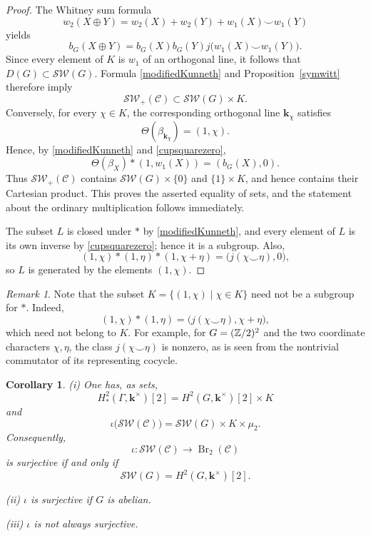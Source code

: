 \documentclass[12pt]{amsart}
\numberwithin{equation}{section}
\providecommand{\k}{}\renewcommand{\k}{\mathbf{k}}
\providecommand{\C}{}\renewcommand{\C}{\mathcal{C}}
\providecommand{\Br}{}\renewcommand{\Br}{\operatorname{Br}}
\theoremstyle{plain}
\newtheorem{corollary}[theorem]{Corollary}
\theoremstyle{definition}
\theoremstyle{remark}
\newtheorem{remark}[theorem]{Remark}
\begin{document}
\begin{proof} The Whitney sum formula
$$
w_2(X\oplus Y)=w_2(X)+w_2(Y)+w_1(X)\smile w_1(Y)
$$
yields
\begin{equation}\label{Whitneysumdegree2}
b_G(X\oplus Y)=b_G(X)b_G(Y)j\bigl(w_1(X)\smile w_1(Y)\bigr).
\end{equation}
Since every element of $K$ is $w_1$ of an orthogonal line, it follows that $D(G)\subset {\mathcal S\mathcal W}(G)$. Formula \eqref{modifiedKunneth} and Proposition~\ref{symwitt} therefore imply
\[
\mathcal S\mathcal W_+(\C)\subset {\mathcal S\mathcal W}(G)\times K.
\]
Conversely, for every $\chi\in K$, the corresponding orthogonal line $\k_\chi$ satisfies
\[
\Theta(\beta_{\k_\chi})=(1,\chi).
\]
Hence, by \eqref{modifiedKunneth} and \eqref{cupsquarezero},
\[
\Theta(\beta_X)*(1,w_1(X))=(b_G(X),0).
\]
Thus $\mathcal S\mathcal W_+(\C)$ contains ${\mathcal S\mathcal W}(G)\times\{0\}$ and $\{1\}\times K$, and hence contains their Cartesian product. This proves the asserted equality of sets, and the statement about the ordinary multiplication follows immediately.

The subset $L$ is closed under $*$ by \eqref{modifiedKunneth}, and every element of $L$ is its own inverse by \eqref{cupsquarezero}; hence it is a subgroup. Also,
\[
(1,\chi)*(1,\eta)*(1,\chi+\eta)=\bigl(j(\chi\smile\eta),0\bigr),
\]
so $L$ is generated by the elements $(1,\chi)$. 
\end{proof}

\begin{remark} Note that the subset $K=\{(1,\chi)\mid\chi\in K\}$ need not be a subgroup for $*$. Indeed, 
\[
(1,\chi)*(1,\eta)=\bigl(j(\chi\smile\eta),\chi+\eta\bigr),
\]
which need not belong to $K$. For example, for $G=(\Bbb Z/2)^2$ and the two coordinate characters $\chi,\eta$, the class $j(\chi\smile\eta)$ is nonzero, as is seen from the nontrivial commutator of its representing cocycle.
\end{remark} 


\begin{corollary}\label{SWsurjectivitycriterion}
(i) One has, as sets,
\[
H^2_*(\Gamma,\k^\times)[2]=H^2(G,\k^\times)[2]\times K
\]
and
\[
\iota\bigl({\mathcal S\mathcal W}(\C)\bigr)
={\mathcal S\mathcal W}(G)\times K\times\mu_2.
\]
Consequently,
\[
\iota:{\mathcal S\mathcal W}(\C)\longrightarrow\Br_2(\C)
\]
is surjective if and only if
\[
{\mathcal S\mathcal W}(G)=H^2(G,\k^\times)[2].
\]

(ii) $\iota$ is surjective if $G$ is abelian. 

(iii) $\iota$ is not always surjective.
\end{corollary}
\end{document}
